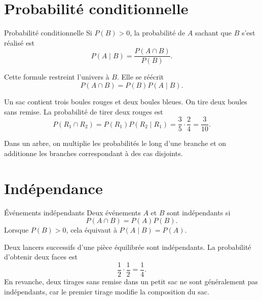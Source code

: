\documentclass[12pt,a4paper,openany]{book}
\begin{document}
\section{Probabilité conditionnelle}

\begin{definition}{Probabilité conditionnelle}{}
Si $P(B)>0$, la probabilité de $A$ sachant que $B$ s'est réalisé est
\[
P(A\mid B)=\frac{P(A\cap B)}{P(B)}.
\]
\end{definition}

Cette formule restreint l'univers à $B$. Elle se réécrit
\[
P(A\cap B)=P(B)P(A\mid B).
\]

\begin{examplebox}
Un sac contient trois boules rouges et deux boules bleues. On tire deux boules sans remise. La probabilité de tirer deux rouges est
\[
P(R_1\cap R_2)=P(R_1)P(R_2\mid R_1)=\frac35\cdot\frac24=\frac3{10}.
\]
\end{examplebox}

\begin{center}
\end{center}

Dans un arbre, on multiplie les probabilités le long d'une branche et on additionne les branches correspondant à des cas disjoints.

\section{Indépendance}

\begin{definition}{Événements indépendants}{}
Deux événements $A$ et $B$ sont indépendants si
\[
P(A\cap B)=P(A)P(B).
\]
Lorsque $P(B)>0$, cela équivaut à $P(A\mid B)=P(A)$.
\end{definition}

\begin{examplebox}
Deux lancers successifs d'une pièce équilibrée sont indépendants. La probabilité d'obtenir deux faces est
\[
\frac12\cdot\frac12=\frac14.
\]
En revanche, deux tirages sans remise dans un petit sac ne sont généralement pas indépendants, car le premier tirage modifie la composition du sac.
\end{examplebox}
\end{document}
